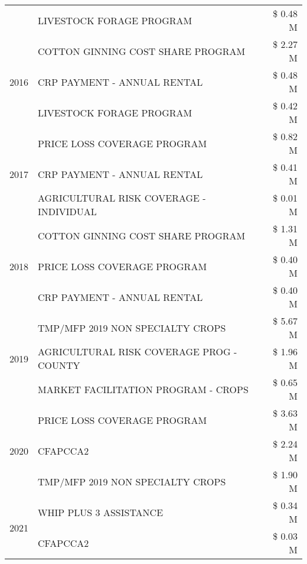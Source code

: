 \begin{tabular}{llr}
 & LIVESTOCK FORAGE PROGRAM & \$ 0.48 M \\
\cline{1-3}
\multirow[t]{3}{*}{2016} & COTTON GINNING COST SHARE PROGRAM & \$ 2.27 M \\
 & CRP PAYMENT - ANNUAL RENTAL & \$ 0.48 M \\
 & LIVESTOCK FORAGE PROGRAM & \$ 0.42 M \\
\cline{1-3}
\multirow[t]{3}{*}{2017} & PRICE LOSS COVERAGE PROGRAM & \$ 0.82 M \\
 & CRP PAYMENT - ANNUAL RENTAL & \$ 0.41 M \\
 & AGRICULTURAL RISK COVERAGE - INDIVIDUAL & \$ 0.01 M \\
\cline{1-3}
\multirow[t]{3}{*}{2018} & COTTON GINNING COST SHARE PROGRAM & \$ 1.31 M \\
 & PRICE LOSS COVERAGE PROGRAM & \$ 0.40 M \\
 & CRP PAYMENT - ANNUAL RENTAL & \$ 0.40 M \\
\cline{1-3}
\multirow[t]{3}{*}{2019} & TMP/MFP 2019 NON SPECIALTY CROPS & \$ 5.67 M \\
 & AGRICULTURAL RISK COVERAGE PROG - COUNTY & \$ 1.96 M \\
 & MARKET FACILITATION PROGRAM - CROPS & \$ 0.65 M \\
\cline{1-3}
\multirow[t]{3}{*}{2020} & PRICE LOSS COVERAGE PROGRAM & \$ 3.63 M \\
 & CFAPCCA2 & \$ 2.24 M \\
 & TMP/MFP 2019 NON SPECIALTY CROPS & \$ 1.90 M \\
\cline{1-3}
\multirow[t]{2}{*}{2021} & WHIP PLUS 3 ASSISTANCE & \$ 0.34 M \\
 & CFAPCCA2 & \$ 0.03 M \\
\cline{1-3}
\bottomrule
\end{tabular}
